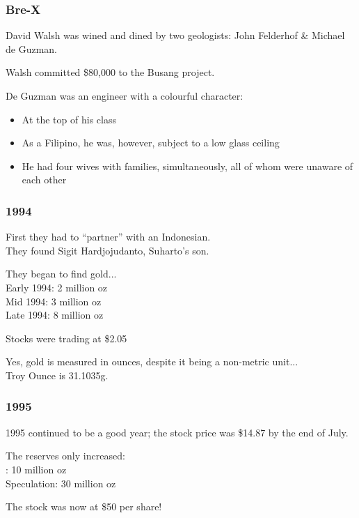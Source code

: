 \begin{frame}
\frametitle{Bre-X}

David Walsh was wined and dined by two geologists: John Felderhof \& Michael de Guzman.

Walsh committed \$80,000 to the Busang project.

De Guzman was an engineer with a colourful character:
\begin{itemize}
	\item At the top of his class
	\item As a Filipino, he was, however, subject to a low glass ceiling
	\item  He had four wives with families, simultaneously, all of whom were unaware of each other
\end{itemize}

\end{frame}



\begin{frame}
\frametitle{1994}

First they had to ``partner'' with an Indonesian.\\
\quad They found Sigit Hardjojudanto, Suharto's son.

They began to find gold...\\
\quad Early 1994:		  2 million oz\\
\quad Mid 1994:		  3 million oz\\
\quad Late 1994:		  8 million oz

Stocks were trading at \$2.05

Yes, gold is measured in ounces, despite it being a non-metric unit...\\
 Troy Ounce is 31.1035g.

\end{frame}



\begin{frame}
\frametitle{1995}

1995 continued to be a good year; the stock price was \$14.87 by the end of July.

The reserves only increased:\\
:			10 million oz\\
\quad Speculation:		30 million oz

The stock was now at \$50 per share!

\end{frame}



